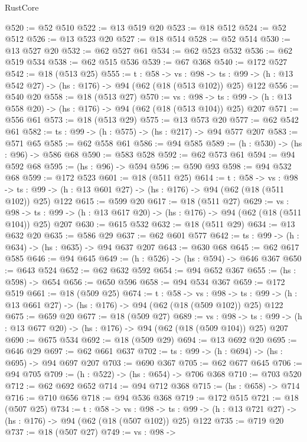 \begin{lexlean}{RustCore}
\begin{coremodule}
@520 := @52 @510
@522 := @13 @519 @20
@523 := @18 @512
@524 := @52 @512
@526 := @13 @523 @20
@527 := @18 @514
@528 := @52 @514
@530 := @13 @527 @20
@532 := @62 @527 @61
@534 := @62 @523 @532
@536 := @62 @519 @534
@538 := @62 @515 @536
@539 := @67 @368
@540 := @172 @527
@542 := @18 (@513 @25)
@555 := {t : @58} ->
  {vs : @98} ->
  {ts : @99} -> (h : @13 @542 @27) -> (hs : @176) -> @94 (@62 (@18 (@513 @102)) @25) @122
@556 := @540 @20
@558 := @18 (@513 @27)
@570 := {vs : @98} ->
  {ts : @99} -> (h : @13 @558 @20) -> (hs : @176) -> @94 (@62 (@18 (@513 @104)) @25) @207
@571 := @556 @61
@573 := @18 (@513 @29)
@575 := @13 @573 @20
@577 := @62 @542 @61
@582 := {ts : @99} -> (h : @575) -> (hs : @217) -> @94 @577 @207
@583 := @571 @65
@585 := @62 @558 @61
@586 := @94 @585
@589 := (h : @530) -> (hs : @96) -> @586 @68
@590 := @583 @528
@592 := @62 @573 @61
@594 := @94 @592 @68
@595 := (hs : @96) -> @594
@596 := @590 @93
@598 := @94 @532 @68
@599 := @172 @523
@601 := @18 (@511 @25)
@614 := {t : @58} ->
  {vs : @98} ->
  {ts : @99} -> (h : @13 @601 @27) -> (hs : @176) -> @94 (@62 (@18 (@511 @102)) @25) @122
@615 := @599 @20
@617 := @18 (@511 @27)
@629 := {vs : @98} ->
  {ts : @99} -> (h : @13 @617 @20) -> (hs : @176) -> @94 (@62 (@18 (@511 @104)) @25) @207
@630 := @615 @532
@632 := @18 (@511 @29)
@634 := @13 @632 @20
@635 := @586 @29
@637 := @62 @601 @577
@642 := {ts : @99} -> (h : @634) -> (hs : @635) -> @94 @637 @207
@643 := @630 @68
@645 := @62 @617 @585
@646 := @94 @645
@649 := (h : @526) -> (hs : @594) -> @646 @367
@650 := @643 @524
@652 := @62 @632 @592
@654 := @94 @652 @367
@655 := (hs : @598) -> @654
@656 := @650 @596
@658 := @94 @534 @367
@659 := @172 @519
@661 := @18 (@509 @25)
@674 := {t : @58} ->
  {vs : @98} ->
  {ts : @99} -> (h : @13 @661 @27) -> (hs : @176) -> @94 (@62 (@18 (@509 @102)) @25) @122
@675 := @659 @20
@677 := @18 (@509 @27)
@689 := {vs : @98} ->
  {ts : @99} -> (h : @13 @677 @20) -> (hs : @176) -> @94 (@62 (@18 (@509 @104)) @25) @207
@690 := @675 @534
@692 := @18 (@509 @29)
@694 := @13 @692 @20
@695 := @646 @29
@697 := @62 @661 @637
@702 := {ts : @99} -> (h : @694) -> (hs : @695) -> @94 @697 @207
@703 := @690 @367
@705 := @62 @677 @645
@706 := @94 @705
@709 := (h : @522) -> (hs : @654) -> @706 @368
@710 := @703 @520
@712 := @62 @692 @652
@714 := @94 @712 @368
@715 := (hs : @658) -> @714
@716 := @710 @656
@718 := @94 @536 @368
@719 := @172 @515
@721 := @18 (@507 @25)
@734 := {t : @58} ->
  {vs : @98} ->
  {ts : @99} -> (h : @13 @721 @27) -> (hs : @176) -> @94 (@62 (@18 (@507 @102)) @25) @122
@735 := @719 @20
@737 := @18 (@507 @27)
@749 := {vs : @98} ->

\end{coremodule}
\end{lexlean}

